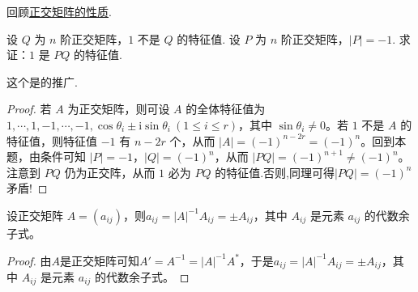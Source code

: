 \documentclass[../../main.tex]{subfiles}%
\begin{document}
回顾\hyperref[theorem:正交矩阵的基本性质1]{正交矩阵的性质}.

\begin{proposition}\label{proposition:例9.44的推广}
设 \(Q\) 为 \(n\) 阶正交矩阵，\(1\) 不是 \(Q\) 的特征值. 设 \(P\) 为 \(n\) 阶正交矩阵，\(\vert P\vert = - 1\). 求证：\(1\) 是 \(PQ\) 的特征值.
\end{proposition}
\begin{remark}
这个是的推广.
\end{remark}
\begin{proof}
若 \(A\) 为正交矩阵，则可设 \(A\) 的全体特征值为 \(1,\cdots,1,-1,\cdots,-1,\cos\theta_i\pm\mathrm{i}\sin\theta_i\ (1\leqslant  i \leqslant  r)\)，其中 \(\sin\theta_i\neq0\)。若 \(1\) 不是 \(A\) 的特征值，则特征值 \(-1\) 有 \(n - 2r\) 个，从而 \(\vert A\vert = (-1)^{n - 2r}=(-1)^n\)。回到本题，由条件可知 \(\vert P\vert = - 1\)，\(\vert Q\vert = (-1)^n\)，从而 \(\vert PQ\vert = (-1)^{n + 1}\neq(-1)^n\)。注意到 \(PQ\) 仍为正交阵，从而 \(1\) 必为 \(PQ\) 的特征值.否则,同理可得$|PQ|=(-1)^n$矛盾!
\end{proof}

\begin{proposition}\label{proposition:正交阵元素的性质}
设正交矩阵 \(A = (a_{ij})\)，则\(a_{ij} = \vert A\vert^{-1}A_{ij} = \pm A_{ij}\)，其中 \(A_{ij}\) 是元素 \(a_{ij}\) 的代数余子式。
\end{proposition}
\begin{proof}
由$A$是正交矩阵可知\(A' = A^{-1} = \vert A\vert^{-1}A^*\)，于是\(a_{ij} = \vert A\vert^{-1}A_{ij} = \pm A_{ij}\)，其中 \(A_{ij}\) 是元素 \(a_{ij}\) 的代数余子式。
\end{proof}
\end{document}

